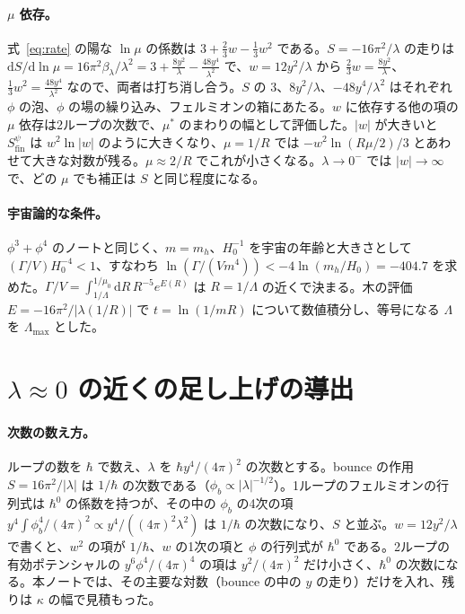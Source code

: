 \documentclass[a4paper,10pt]{ltjsarticle}
\newcommand{\dd}{\mathrm{d}}
\begin{document}
\paragraph{$\mu$ 依存。}式~\eqref{eq:rate} の陽な $\ln\mu$ の係数は $3+\frac23w-\frac13w^2$ である。$S=-16\pi^2/\lambda$ の走りは $\dd S/\dd\ln\mu=16\pi^2\beta_\lambda/\lambda^2=3+\frac{8y^2}{\lambda}-\frac{48y^4}{\lambda^2}$ で、$w=12y^2/\lambda$ から $\frac23w=\frac{8y^2}{\lambda}$、$\frac13w^2=\frac{48y^4}{\lambda^2}$ なので、両者は打ち消し合う。$S$ の $3$、$8y^2/\lambda$、$-48y^4/\lambda^2$ はそれぞれ $\phi$ の泡、$\phi$ の場の繰り込み、フェルミオンの箱にあたる。$w$ に依存する他の項の $\mu$ 依存は2ループの次数で、$\mu^*$ のまわりの幅として評価した。$|w|$ が大きいと $S^\psi_{\mathrm{fin}}$ は $w^2\ln|w|$ のように大きくなり、$\mu=1/R$ では $-w^2\ln(R\mu/2)/3$ とあわせて大きな対数が残る。$\mu\approx2/R$ でこれが小さくなる。$\lambda\to0^-$ では $|w|\to\infty$ で、どの $\mu$ でも補正は $S$ と同じ程度になる。

\paragraph{宇宙論的な条件。}$\phi^3+\phi^4$ のノートと同じく、$m=m_h$、$H_0^{-1}$ を宇宙の年齢と大きさとして $(\Gamma/V)H_0^{-4}<1$、すなわち $\ln(\Gamma/(Vm^4))<-4\ln(m_h/H_0)=-404.7$ を求めた。$\Gamma/V=\int_{1/\Lambda}^{1/\mu_0}\dd R\,R^{-5}e^{E(R)}$ は $R=1/\Lambda$ の近くで決まる。木の評価 $E=-16\pi^2/|\lambda(1/R)|$ で $t=\ln(1/mR)$ について数値積分し、等号になる $\Lambda$ を $\Lambda_{\max}$ とした。

\section{$\lambda\approx0$ の近くの足し上げの導出}\label{app:resum}

\paragraph{次数の数え方。}ループの数を $\hbar$ で数え、$\lambda$ を $\hbar y^4/(4\pi)^2$ の次数とする。bounce の作用 $S=16\pi^2/|\lambda|$ は $1/\hbar$ の次数である（$\phi_b\propto|\lambda|^{-1/2}$）。1ループのフェルミオンの行列式は $\hbar^0$ の係数を持つが、その中の $\phi_b$ の4次の項 $y^4\int\phi_b^4/(4\pi)^2\propto y^4/((4\pi)^2\lambda^2)$ は $1/\hbar$ の次数になり、$S$ と並ぶ。$w=12y^2/\lambda$ で書くと、$w^2$ の項が $1/\hbar$、$w$ の1次の項と $\phi$ の行列式が $\hbar^0$ である。2ループの有効ポテンシャルの $y^6\phi^4/(4\pi)^4$ の項は $y^2/(4\pi)^2$ だけ小さく、$\hbar^0$ の次数になる。本ノートでは、その主要な対数（bounce の中の $y$ の走り）だけを入れ、残りは $\kappa$ の幅で見積もった。
\end{document}
